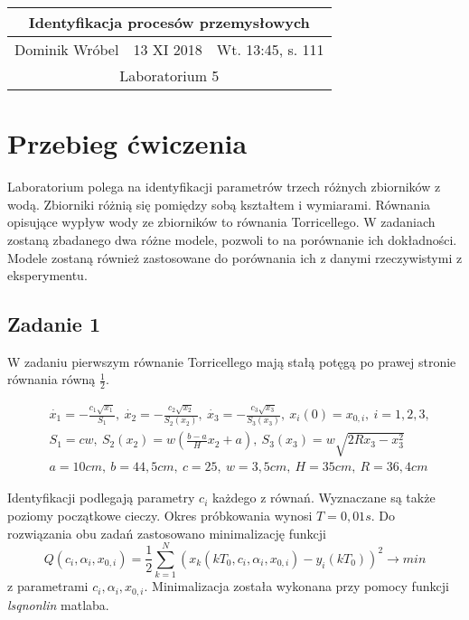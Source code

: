 \documentclass[a4paper,15pt]{article}
\begin{document}

\begin{table}
\begin{center}
\begin{tabular}{|l|l|l|}
\hline
\multicolumn{3}{|c|}{\textbf{Identyfikacja procesów przemysłowych}} \\ \hline Dominik Wróbel & 13 XI 2018 & Wt. 13:45, s. 111 \\ \hline
\multicolumn{3}{|c|}{Laboratorium 5} \\ \hline 
\end{tabular}
\end{center}
\end{table}


\section{Przebieg ćwiczenia}

Laboratorium polega na identyfikacji parametrów trzech różnych zbiorników z wodą. Zbiorniki różnią się pomiędzy sobą kształtem i wymiarami. Równania opisujące wypływ wody ze zbiorników to równania Torricellego. W zadaniach zostaną zbadanego dwa różne modele, pozwoli to na porównanie ich dokładności. Modele zostaną również zastosowane do porównania ich z danymi rzeczywistymi z eksperymentu. 
  
\subsection{Zadanie 1 }

W zadaniu pierwszym równanie Torricellego mają stałą potęgą po prawej stronie równania równą \( \frac{1}{2} \).

\begin{align*}
& \dot{x_1}= - \frac{c_1\sqrt{x_1}}{S_1}, \ \dot{x_2}=-\frac{c_2\sqrt{x_2}}{S_2(x_2)}, \ \dot{x_3} = - \frac{c_3\sqrt{x_3}}{S_3(x_3)}, \ x_i(0) = x_{0,i}, \ i=1,2,3, \\
& S_1 = cw, \ S_2(x_2) = w(\frac{b-a}{H}x_2+a), \ S_3(x_3)=w\sqrt{2Rx_3-x_3^2} \\
& a=10cm, \ b=44,5cm, \ c=25, \ w=3,5cm, \ H=35cm, \ R=36,4cm
\end{align*}

Identyfikacji podlegają parametry \( c_i \) każdego z równań. Wyznaczane są także poziomy początkowe cieczy. Okres próbkowania wynosi \( T=0,01s \). Do rozwiązania obu zadań zastosowano minimalizację funkcji 
\begin{equation*}
Q(c_i,\alpha _i, x_{0,i} ) =\frac{1}{2}\sum _{k=1}^{N} (x_k(kT_0, c_i,\alpha _i, x_{0,i}) - y_i(kT_0))^2 \rightarrow min
\end{equation*}
z parametrami \( c_i, \alpha _i, x_{0,i} \). Minimalizacja została wykonana przy pomocy funkcji \textit{lsqnonlin} matlaba. 
\end{document}
